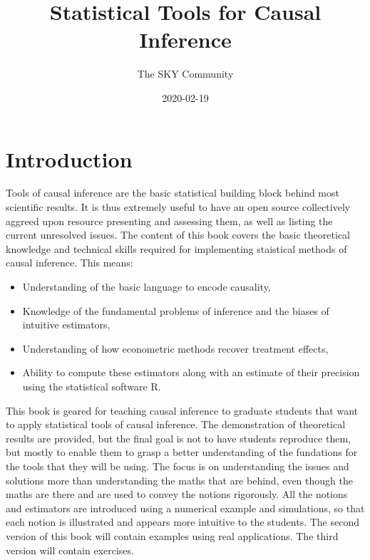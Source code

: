 \documentclass[]{book}
\title{Statistical Tools for Causal Inference}
\author{The SKY Community}
\date{2020-02-19}
\providecommand{\tightlist}{%
  \setlength{\itemsep}{0pt}\setlength{\parskip}{0pt}}
\theoremstyle{definition}
\theoremstyle{definition}
\theoremstyle{definition}
\theoremstyle{remark}
\begin{document}
\maketitle

{
\setcounter{tocdepth}{0}
\tableofcontents
}
\hypertarget{introduction}{%
\chapter*{Introduction}\label{introduction}}

Tools of causal inference are the basic statistical building block behind most scientific results.
It is thus extremely useful to have an open source collectively aggreed upon resource presenting and assessing them, as well as listing the current unresolved issues.
The content of this book covers the basic theoretical knowledge and technical skills required for implementing staistical methods of causal inference.
This means:

\begin{itemize}
\tightlist
\item
  Understanding of the basic language to encode causality,
\item
  Knowledge of the fundamental problems of inference and the biases of intuitive estimators,
\item
  Understanding of how econometric methods recover treatment effects,
\item
  Ability to compute these estimators along with an estimate of their precision using the statistical software R.
\end{itemize}

This book is geared for teaching causal inference to graduate students that want to apply statistical tools of causal inference.
The demonstration of theoretical results are provided, but the final goal is not to have students reproduce them, but mostly to enable them to grasp a better understanding of the fundations for the tools that they will be using.
The focus is on understanding the issues and solutions more than understanding the maths that are behind, even though the maths are there and are used to convey the notions rigorously.
All the notions and estimators are introduced using a numerical example and simulations, so that each notion is illustrated and appears more intuitive to the students.
The second version of this book will contain examples using real applications.
The third version will contain exercises.
\end{document}
